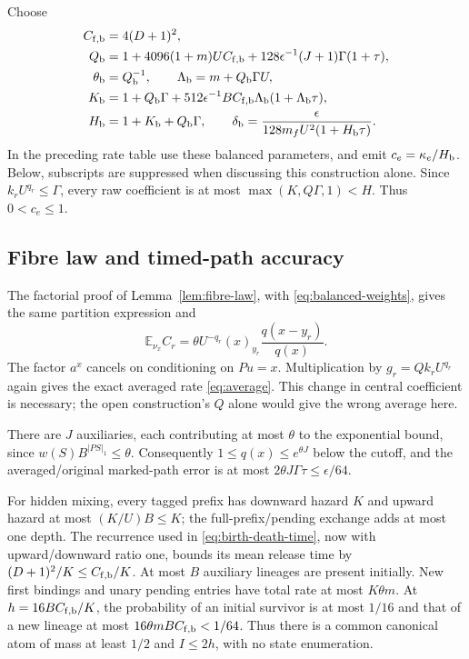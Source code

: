 \documentclass[11pt,reqno]{amsart}
\theoremstyle{definition}
\theoremstyle{remark}
\newcommand{\E}{\mathbb E}
\begin{document}
Choose
\begin{align}
 C_{{\rm f},\rm b}&=4(D+1)^2,\nonumber\\
 Q_{\rm b}&=1+4096(1+m)U C_{{\rm f},\rm b}
 +128\epsilon^{-1}(J+1)\Gamma(1+\tau),\nonumber\\
 \theta_{\rm b}&=Q_{\rm b}^{-1},\qquad
 \Lambda_{\rm b}=m+Q_{\rm b}\Gamma U,\nonumber\\
 K_{\rm b}&=1+Q_{\rm b}\Gamma+
 512\epsilon^{-1}BC_{{\rm f},\rm b}\Lambda_{\rm b}
 (1+\Lambda_{\rm b}\tau),\nonumber\\
 H_{\rm b}&=1+K_{\rm b}+Q_{\rm b}\Gamma,\qquad
 \delta_{\rm b}=\frac{\epsilon}{128m_fU^2(1+H_{\rm b}\tau)}.
 \label{eq:balanced-parameters}
\end{align}
In the preceding rate table use these balanced parameters, and emit
$c_e=\kappa_e/H_{\rm b}$. Below, subscripts are suppressed when discussing
this construction alone. Since $k_rU^{q_r}\le\Gamma$, every raw coefficient
is at most $\max(K,Q\Gamma,1)<H$. Thus $0<c_e\le1$.

\subsection{Fibre law and timed-path accuracy}
The factorial proof of Lemma~\ref{lem:fibre-law}, with
\eqref{eq:balanced-weights}, gives the same partition expression and
\begin{equation}\label{eq:balanced-pending-mean}
 \E_{\nu_x}C_r=\theta U^{-q_r}(x)_{y_r}
                  \frac{q(x-y_r)}{q(x)}.
\end{equation}
The factor $a^x$ cancels on conditioning on $Pu=x$. Multiplication by
$g_r=Qk_rU^{q_r}$ again gives the exact averaged rate
\eqref{eq:average}. This change in central coefficient is necessary; the
open construction's $Q$ alone would give the wrong average here.

There are $J$ auxiliaries, each contributing at most $\theta$ to the
exponential bound, since $w(S)B^{|PS|_1}\le\theta$.
Consequently $1\le q(x)\le e^{\theta J}$ below the cutoff, and the
averaged/original marked-path error is at most
$2\theta J\Gamma\tau\le\epsilon/64$.

For hidden mixing, every tagged prefix has downward hazard $K$ and upward
hazard at most $(K/U)B\le K$; the full-prefix/pending exchange adds at most
one depth. The recurrence used in \eqref{eq:birth-death-time}, now with
upward/downward ratio one, bounds its mean release time by
$(D+1)^2/K\le C_{{\rm f},\rm b}/K$. At most $B$ auxiliary lineages are
present initially. New first bindings and unary pending entries have total
rate at most $K\theta m$. At $h=16BC_{{\rm f},\rm b}/K$, the probability
of an initial survivor is at most $1/16$ and that of a new lineage at most
$16\theta mBC_{{\rm f},\rm b}<1/64$. Thus there is a common canonical atom
of mass at least $1/2$ and $I\le2h$, with no state enumeration.
\end{document}
